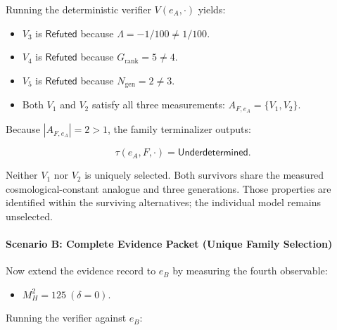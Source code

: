 \documentclass[
  10pt,
]{article}
\providecommand{\tightlist}{%
  \setlength{\itemsep}{0pt}\setlength{\parskip}{0pt}}
\providecommand{\tightlist}{%
  \setlength{\itemsep}{0pt}\setlength{\parskip}{0pt}}
\begin{document}
Running the deterministic verifier \hypertarget{math-E0199-0288}{}{\(V(e_A, \cdot)\)} yields:

\begin{itemize}
\item
  \hypertarget{math-E0189-0289}{}{\(V_3\)} is \hypertarget{math-E0152-0290}{}{\(\mathsf{Refuted}\)} because \hypertarget{math-E0200-0291}{}{\(\Lambda = -1/100 \ne 1/100\)}.
\item
  \hypertarget{math-E0191-0292}{}{\(V_4\)} is \hypertarget{math-E0152-0293}{}{\(\mathsf{Refuted}\)} because \hypertarget{math-E0201-0294}{}{\(G_{\text{rank}} = 5 \ne 4\)}.
\item
  \hypertarget{math-E0193-0295}{}{\(V_5\)} is \hypertarget{math-E0152-0296}{}{\(\mathsf{Refuted}\)} because \hypertarget{math-E0202-0297}{}{\(N_{\text{gen}} = 2 \ne 3\)}.
\item
  Both \hypertarget{math-E0182-0298}{}{\(V_1\)} and \hypertarget{math-E0187-0299}{}{\(V_2\)} satisfy all three measurements: \hypertarget{math-E0203-0300}{}{\(A_{F,e_A} = \{V_1, V_2\}\)}.
\end{itemize}

Because \hypertarget{math-E0204-0301}{}{\(|A_{F,e_A}| = 2 > 1\)}, the family terminalizer outputs:

\hypertarget{math-E0205-0302}{}{\[\tau(e_A, F, \cdot) = \mathsf{Underdetermined}.\]}

Neither \hypertarget{math-E0182-0303}{}{\(V_1\)} nor \hypertarget{math-E0187-0304}{}{\(V_2\)} is uniquely selected. Both survivors share the measured cosmological-constant analogue and three generations. Those properties are identified within the surviving alternatives; the individual model remains unselected.

\paragraph{Scenario B: Complete Evidence Packet (Unique Family Selection)}\label{scenario-b-complete-evidence-packet-unique-family-selection}

Now extend the evidence record to \hypertarget{math-E0206-0305}{}{\(e_B\)} by measuring the fourth observable:

\begin{itemize}
\tightlist
\item
  \hypertarget{math-E0207-0306}{}{\(M_H^2 = 125 \ (\delta = 0)\)}.
\end{itemize}

Running the verifier against \hypertarget{math-E0206-0307}{}{\(e_B\)}:
\end{document}
